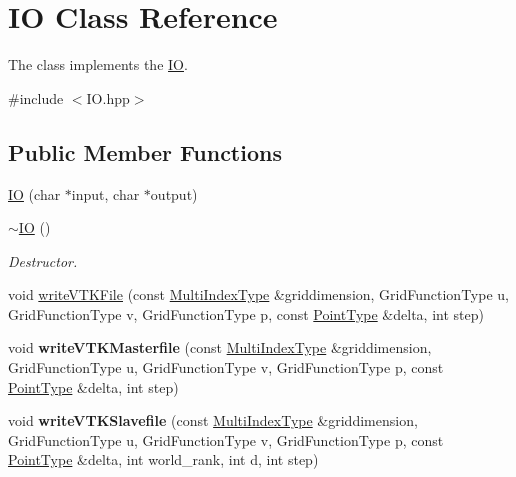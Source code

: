 \hypertarget{classIO}{\section{I\-O Class Reference}
\label{classIO}
}


The class implements the \hyperlink{classIO}{I\-O}.  




{\ttfamily \#include $<$I\-O.\-hpp$>$}

\subsection*{Public Member Functions}
\begin{DoxyCompactItemize}
\item 
\hyperlink{classIO_ac100fd32b66e2c0e1ad53fdcd15a1b99}{I\-O} (char $\ast$input, char $\ast$output)
\item 
\hypertarget{classIO_a44861ff225d351615179f0f24cb8d7f6}{\hyperlink{classIO_a44861ff225d351615179f0f24cb8d7f6}{$\sim$\-I\-O} ()}\label{classIO_a44861ff225d351615179f0f24cb8d7f6}

\begin{DoxyCompactList}\small\item\em Destructor. \end{DoxyCompactList}\item 
void \hyperlink{classIO_a3484172971065b005ef6bfa8f42febef}{write\-V\-T\-K\-File} (const \hyperlink{classArray}{Multi\-Index\-Type} \&griddimension, Grid\-Function\-Type u, Grid\-Function\-Type v, Grid\-Function\-Type p, const \hyperlink{classArray}{Point\-Type} \&delta, int step)
\item 
\hypertarget{classIO_a900423d1c5042730a7f2b3fe3bc46914}{void {\bfseries write\-V\-T\-K\-Masterfile} (const \hyperlink{classArray}{Multi\-Index\-Type} \&griddimension, Grid\-Function\-Type u, Grid\-Function\-Type v, Grid\-Function\-Type p, const \hyperlink{classArray}{Point\-Type} \&delta, int step)}\label{classIO_a900423d1c5042730a7f2b3fe3bc46914}

\item 
\hypertarget{classIO_a2c32eb55116d14193a0c7a0a23e27f42}{void {\bfseries write\-V\-T\-K\-Slavefile} (const \hyperlink{classArray}{Multi\-Index\-Type} \&griddimension, Grid\-Function\-Type u, Grid\-Function\-Type v, Grid\-Function\-Type p, const \hyperlink{classArray}{Point\-Type} \&delta, int world\-\_\-rank, int d, int step)}\label{classIO_a2c32eb55116d14193a0c7a0a23e27f42}

\end{DoxyCompactItemize}
